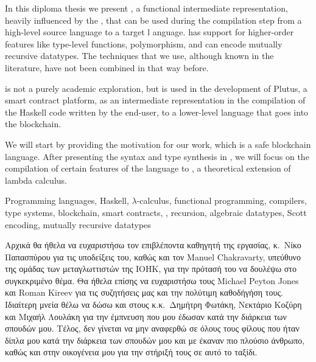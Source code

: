 \documentclass[diploma]{softlab-thesis}
\begin{document}

\begin{abstracten}%
In this diploma thesis we present \FIR{}, a functional intermediate representation, heavily influenced
by the \FOM{}, that can be used during the compilation step from a high-level source language to a target l
anguage. \FIR{} has support for higher-order features like type-level functions, polymorphism, and can encode
mutually recursive datatypes. The techniques that we use, although known in the literature, have
not been combined in that way before.

\FIR{} is not a purely academic exploration, but is used in the development of Plutus, a smart contract
platform, as an intermediate representation in the compilation of the Haskell code written by the end-user,
to a lower-level language that goes into the blockchain.

We will start by providing the motivation for our work, which is a safe blockchain language. After presenting the syntax and type synthesis in \FIR{}, we will focus on the compilation of certain features
of the language to \FOMF, a theoretical extension of lambda calculus.

\begin{keywordsen}
Programming languages, Haskell, $\lambda$-calculus, functional programming, compilers, type systems, \linebreak blockchain, smart contracts, 
\FOM{}, recursion, algebraic datatypes, Scott encoding, mutually recursive datatypes
\end{keywordsen}
\end{abstracten}


\begin{acknowledgementsgr}
Αρχικά θα ήθελα να ευχαριστήσω τον επιβλέποντα καθηγητή της εργασίας, κ.\ Νίκο Παπασπύρου για τις υποδείξεις του, καθώς και τον Manuel Chakravarty, υπεύθυνο της ομάδας των μεταγλωττιστών της IOHK, για την πρότασή του να δουλέψω στο συγκεκριμένο θέμα. Θα ήθελα επίσης να ευχαριστήσω τους Michael Peyton Jones και Roman Kireev για τις συζητήσεις μας και την πολύτιμη καθοδήγήση τους. Ιδιαίτερη μνεία
θέλω να δώσω και στους κ.κ.\ Δημήτρη Φωτάκη, Νεκτάριο Κοζύρη και Μιχαήλ Λουλάκη για την έμπνευση
που μου έδωσαν κατά την διάρκεια των σπουδών μου.
Τέλος, δεν γίνεται να μην αναφερθώ σε όλους τους φίλους που ήταν δίπλα μου κατά την διάρκεια των σπουδών μου και με έκαναν πιο πλούσιο άνθρωπο, καθώς και στην οικογένεια μου για την στήριξή τους σε αυτό το ταξίδι.
\end{acknowledgementsgr}
\end{document}
